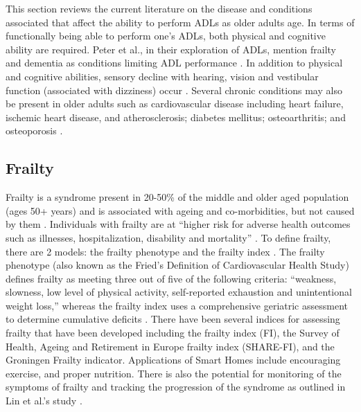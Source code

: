 This section reviews the current literature on the disease and conditions associated that affect the ability to perform ADLs as older adults age. In terms of functionally being able to perform one's ADLs, both physical and cognitive ability are required. Peter et al., in their exploration of ADLs, mention frailty and dementia as conditions limiting ADL performance \cite{edemekong_activities_2022}. In addition to physical and cognitive abilities, sensory decline with hearing, vision and vestibular function (associated with dizziness) occur \cite{jaul_age-related_2017}. Several chronic conditions may also be present in older adults such as cardiovascular disease including heart failure, ischemic heart disease, and atherosclerosis; diabetes mellitus; osteoarthritis; and osteoporosis \cite{jaul_age-related_2017}.


\subsection{Frailty}
Frailty is a syndrome present in 20-50\% of the middle and older aged population (ages 50+ years) \cite{hewitt_prevalence_2018} and is associated with ageing and co-morbidities, but not caused by them \cite{conroy_defining_2009}. Individuals with frailty are at “higher risk for adverse health outcomes such as illnesses, hospitalization, disability and mortality” . To define frailty, there are 2 models: the frailty phenotype and the frailty index \cite{chen_frailty_2014}. The frailty phenotype (also known as the Fried’s Definition of Cardiovascular Health Study) defines frailty as meeting three out of five of the following criteria: “weakness, slowness, low level of physical activity, self-reported exhaustion and unintentional weight loss,” whereas the frailty index uses a comprehensive geriatric assessment to determine cumulative deficits \cite{chen_frailty_2014}. There have been several indices for assessing frailty that have been developed including the frailty index (FI), the Survey of Health, Ageing and Retirement in Europe frailty index (SHARE-FI), and the Groningen Frailty indicator. Applications of Smart Homes include encouraging exercise, and proper nutrition. There is also the potential for monitoring of the symptoms of frailty and tracking the progression of the syndrome as outlined in Lin et al.’s study \cite{lin_development_2016}.


